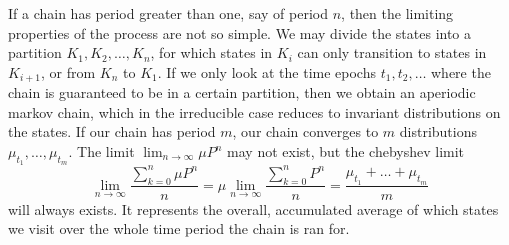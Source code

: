 If a chain has period greater than one, say of period $n$, then the limiting properties of the process are not so simple. We may divide the states into a partition $K_1, K_2, \dots, K_n$, for which states in $K_i$ can only transition to states in $K_{i+1}$, or from $K_n$ to $K_1$. If we only look at the time epochs $t_1, t_2, \dots$ where the chain is guaranteed to be in a certain partition, then we obtain an aperiodic markov chain, which in the irreducible case reduces to invariant distributions on the states. If our chain has period $m$, our chain converges to $m$ distributions $\mu_{t_1}, \dots, \mu_{t_m}$. The limit $\lim_{n \to \infty} \mu P^n$ may not exist, but the chebyshev limit
%
\[ \lim_{n \to \infty} \frac{\sum_{k = 0}^n \mu P^n}{n} = \mu \lim_{n \to \infty} \frac{\sum_{k = 0}^n P^n}{n} = \frac{\mu_{t_1} + \dots + \mu_{t_m}}{m} \]
%
will always exists. It represents the overall, accumulated average of which states we visit over the whole time period the chain is ran for.

